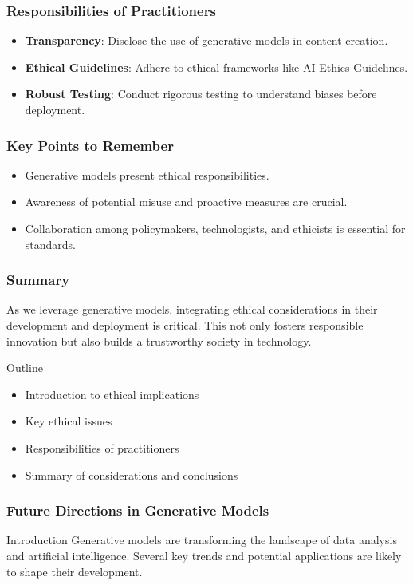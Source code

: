 \documentclass[aspectratio=169]{beamer}
\begin{document}
\begin{frame}[fragile]
    \frametitle{Responsibilities of Practitioners}
    \begin{itemize}
        \item \textbf{Transparency}: Disclose the use of generative models in content creation.
        
        \item \textbf{Ethical Guidelines}: Adhere to ethical frameworks like AI Ethics Guidelines.
        
        \item \textbf{Robust Testing}: Conduct rigorous testing to understand biases before deployment.
    \end{itemize}
\end{frame}

\begin{frame}[fragile]
    \frametitle{Key Points to Remember}
    \begin{itemize}
        \item Generative models present ethical responsibilities.
        \item Awareness of potential misuse and proactive measures are crucial.
        \item Collaboration among policymakers, technologists, and ethicists is essential for standards.
    \end{itemize}
\end{frame}

\begin{frame}[fragile]
    \frametitle{Summary}
    As we leverage generative models, integrating ethical considerations in their development and deployment is critical. This not only fosters responsible innovation but also builds a trustworthy society in technology.
    
    \begin{block}{Outline}
        \begin{itemize}
            \item Introduction to ethical implications
            \item Key ethical issues
            \item Responsibilities of practitioners
            \item Summary of considerations and conclusions
        \end{itemize}
    \end{block}
\end{frame}

\begin{frame}[fragile]
    \frametitle{Future Directions in Generative Models}
    \begin{block}{Introduction}
        Generative models are transforming the landscape of data analysis and artificial intelligence. Several key trends and potential applications are likely to shape their development.
    \end{block}
\end{frame}
\end{document}
